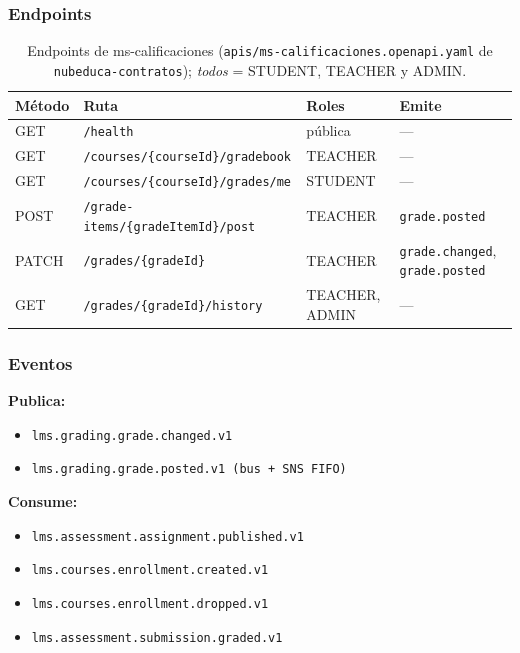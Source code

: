 \subsubsection{Endpoints}
\begin{table}[htbp]
\centering\footnotesize
\begin{tabularx}{\textwidth}{lXll}
\toprule
Método & Ruta & Roles & Emite \\
\midrule
GET    & \texttt{/health} & pública & --- \\
GET    & \texttt{/courses/\{courseId\}/gradebook} & TEACHER & --- \\
GET    & \texttt{/courses/\{courseId\}/grades/me} & STUDENT & --- \\
POST   & \texttt{/grade-items/\{gradeItemId\}/post} & TEACHER & \texttt{grade.posted} \\
PATCH  & \texttt{/grades/\{gradeId\}} & TEACHER & \texttt{grade.changed}, \texttt{grade.posted} \\
GET    & \texttt{/grades/\{gradeId\}/history} & TEACHER, ADMIN & --- \\
\bottomrule
\end{tabularx}
\caption{Endpoints de ms-calificaciones (\texttt{apis/ms-calificaciones.openapi.yaml} de \texttt{nubeduca-contratos}); \textit{todos} = STUDENT, TEACHER y ADMIN.}
\end{table}

\subsubsection{Eventos}
\textbf{Publica:}
\begin{itemize}
  \item \texttt{lms.grading.grade.changed.v1}
  \item \texttt{lms.grading.grade.posted.v1 (bus + SNS FIFO)}
\end{itemize}

\textbf{Consume:}
\begin{itemize}
  \item \texttt{lms.assessment.assignment.published.v1}
  \item \texttt{lms.courses.enrollment.created.v1}
  \item \texttt{lms.courses.enrollment.dropped.v1}
  \item \texttt{lms.assessment.submission.graded.v1}
\end{itemize}

